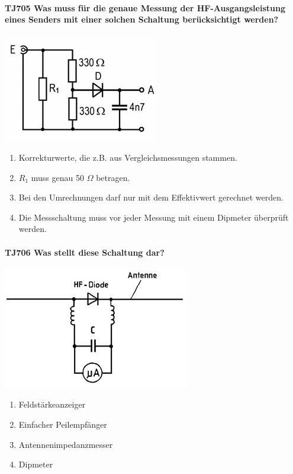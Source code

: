 \documentclass[8pt]{article}
\begin{document}
\paragraph*{TJ705 Was muss für die genaue Messung der HF-Ausgangsleistung eines Senders mit einer solchen Schaltung berücksichtigt werden?} 
\begin{center}
	\begin{minipage}{\linewidth}
		\centering
		\includegraphics[scale=1.0]{pics/tj705_a.jpg}
	\end{minipage}
\end{center}
\begin{enumerate}[nolistsep,label=\Alph*]
\item Korrekturwerte, die z.B. aus Vergleichsmessungen stammen.
\item $R_{1}$ muss genau 50 $\Omega$ betragen.
\item Bei den Umrechnungen darf nur mit dem Effektivwert gerechnet werden.
\item Die Messschaltung muss vor jeder Messung mit einem Dipmeter überprüft werden.
\end{enumerate}

\paragraph*{TJ706 Was stellt diese Schaltung dar?}
\begin{center}
	\begin{minipage}{\linewidth}
		\centering
		\includegraphics[scale=1.0]{pics/tj706_a.jpg}
	\end{minipage}
\end{center}
\begin{enumerate}[nolistsep,label=\Alph*]
\item Feldstärkeanzeiger
\item Einfacher Peilempfänger
\item Antennenimpedanzmesser
\item Dipmeter
\end{enumerate}
\end{document}
